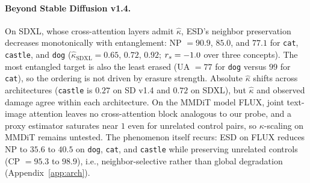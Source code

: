 \paragraph{Beyond Stable Diffusion v1.4.} On SDXL, whose cross-attention layers admit $\hat\kappa$, ESD's neighbor preservation decreases monotonically with entanglement: NP $=90.9$, $85.0$, and $77.1$ for \texttt{cat}, \texttt{castle}, and \texttt{dog} ($\hat\kappa_{\text{SDXL}}=0.65$, $0.72$, $0.92$; $r_s=-1.0$ over three concepts). The most entangled target is also the least erased (UA $=77$ for \texttt{dog} versus $99$ for \texttt{cat}), so the ordering is not driven by erasure strength. Absolute $\hat\kappa$ shifts across architectures (\texttt{castle} is $0.27$ on SD v1.4 and $0.72$ on SDXL), but $\hat\kappa$ and observed damage agree within each architecture. On the MMDiT model FLUX, joint text-image attention leaves no cross-attention block analogous to our probe, and a proxy estimator saturates near $1$ even for unrelated control pairs, so $\kappa$-scaling on MMDiT remains untested. The phenomenon itself recurs: ESD on FLUX reduces NP to $35.6$ to $40.5$ on \texttt{dog}, \texttt{cat}, and \texttt{castle} while preserving unrelated controls (CP $=95.3$ to $98.9$), i.e., neighbor-selective rather than global degradation (Appendix~\ref{app:arch}).


